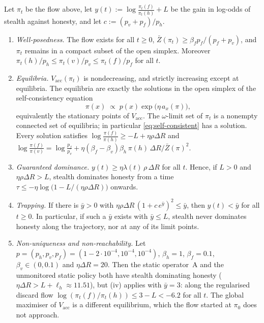 \begin{proposition}\label{prop:discard-kl}
Let $\pi_t$ be the flow above, let
$y(t):=\log\frac{\pi_t(f)}{\pi_t(h)}+L$ be the gain in log-odds of stealth
against honesty, and let $c:=(p_v+p_f)/p_h$.
\begin{enumerate}
\item[\textup{(i)}] \emph{Well-posedness.} The flow exists for all
$t\ge0$, $\bar Z(\pi_t)\ge\beta_fp_f/(p_f+p_v)$, and $\pi_t$ remains in a
compact subset of the open simplex. Moreover
$\pi_t(h)/p_h\le\pi_t(v)/p_v\le\pi_t(f)/p_f$ for all $t$.
\item[\textup{(ii)}] \emph{Equilibria.} $V_{\mathrm{acc}}(\pi_t)$ is
nondecreasing, and strictly increasing except at equilibria. The
equilibria are exactly the solutions in the open simplex of the
self-consistency equation
\begin{equation}\label{eq:self-consistent}
\pi(x)\;\propto\;p(x)\exp\bigl(\eta\,a_x(\pi)\bigr),
\end{equation}
equivalently the stationary points of $V_{\mathrm{acc}}$. The
$\omega$-limit set of $\pi_t$ is a nonempty connected set of equilibria; in
particular \eqref{eq:self-consistent} has a solution. Every solution
satisfies $\log\frac{\pi(f)}{\pi(h)}\ge-L+\eta\rho\Delta R$ and
$\log\frac{\pi(f)}{\pi(v)}=\log\frac{p_f}{p_v}+\eta(\beta_f-\beta_v)\beta_h\,\pi(h)\,\Delta R/\bar Z(\pi)^2$.
\item[\textup{(iii)}] \emph{Guaranteed dominance.}
$y(t)\ge\eta\lambda(t)\,\rho\,\Delta R$ for all $t$. Hence, if $L>0$ and
$\eta\rho\Delta R>L$, stealth dominates honesty from a time
$\tau\le-\eta\log\bigl(1-L/(\eta\rho\Delta R)\bigr)$ onwards.
\item[\textup{(iv)}] \emph{Trapping.} If there is $\bar y>0$ with
$\eta\rho\Delta R\,(1+c\,e^{\bar y})^2\le\bar y$, then $y(t)<\bar y$ for all
$t\ge0$. In particular, if such a $\bar y$ exists with $\bar y\le L$,
stealth never dominates honesty along the trajectory, nor at any of its
limit points.
\item[\textup{(v)}] \emph{Non-uniqueness and non-reachability.} Let
$p=(p_h,p_v,p_f)=(1-2\cdot10^{-4},10^{-4},10^{-4})$, $\beta_h=1$,
$\beta_f=0.1$, $\beta_v\in(0,0.1)$ and $\eta\Delta R=20$. Then the static
operator~A and the unmonitored static policy both have stealth dominating
honesty ($\eta\Delta R>L+\ell_h\approx11.51$), but \textup{(iv)} applies
with $\bar y=3$: along the regularised discard flow
$\log(\pi_t(f)/\pi_t(h))\le3-L<-6.2$ for all $t$. The global maximiser of
$V_{\mathrm{acc}}$ is a different equilibrium, which the flow started at
$\pi_0$ does not approach.
\end{enumerate}
\end{proposition}


